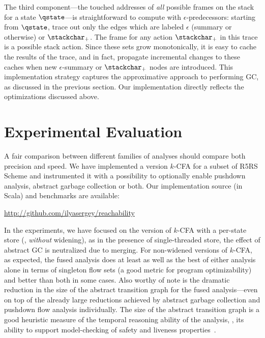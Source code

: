 The third component---the touched addresses of \emph{all} possible frames on the stack for a state
$\qstate$---is straightforward to compute with $\epsilon$-predecessors:
starting from $\qstate$, trace out only the edges which are labeled $\epsilon$
(summary or otherwise) or $\stackchar_+$.
The frame for any action $\stackchar_+$ in this trace is a possible stack
action.
Since these sets grow monotonically, it is easy to cache the results
of the trace, and in fact, propagate incremental changes to these
caches when new $\epsilon$-summary or $\stackchar_+$ nodes are
introduced.
This implementation strategy captures the approximative approach to performing GC, as discussed in the previous section.
Our implementation directly reflects the optimizations discussed above.


\section{Experimental Evaluation}
\label{sec:experiments}

A fair comparison between different families of analyses
should compare both precision and speed.
We have implemented a version $k$-CFA for a subset of R5RS Scheme and
instrumented it with a possibility to optionally enable pushdown
analysis, abstract garbage collection or both.
Our implementation source (in Scala) and benchmarks are available:
\begin{center}
\url{http://github.com/ilyasergey/reachability}
\end{center}

In the experiments, we have focused on the version of $k$-CFA with a
per-state store (\ie, \emph{without} widening), as in the presence of
single-threaded store, the effect of abstract GC is neutralized due to
merging. For non-widened versions of $k$-CFA, as expected, the fused
analysis does at least as well as the best of either analysis alone in
terms of singleton flow sets (a good metric for program
optimizability) and better than both in some cases.
Also worthy of note is the dramatic reduction in the size of the
abstract transition graph for the fused analysis---even on top of the
already large reductions achieved by abstract garbage collection and
pushdown flow analysis individually.
The size of the abstract transition graph is a good heuristic measure of the temporal
reasoning ability of the analysis, \eg, its ability to support model-checking
of safety and liveness
properties~\cite{mattmight:Might:2007:ModelChecking}.

